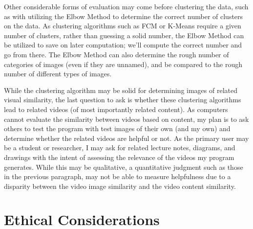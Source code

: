 \documentclass[10pt,twocolumn]{article}
\begin{document}
Other considerable forms of evaluation may come before clustering the data, such as with utilizing the Elbow Method to determine the correct number of clusters on the data. As clustering algorithms such as FCM or K-Means require a given number of clusters, rather than guessing a solid number, the Elbow Method can be utilized to save on later computation; we'll compute the correct number and go from there. The Elbow Method can also determine the rough number of categories of images (even if they are unnamed), and be compared to the rough number of different types of images.

While the clustering algorithm may be solid for determining images of related visual similarity, the last question to ask is whether these clustering algorithms lead to related videos (of most importantly related content). As computers cannot evaluate the similarity between videos based on content, my plan is to ask others to test the program with test images of their own (and my own) and determine whether the related videos are helpful or not. As the primary user may be a student or researcher, I may ask for related lecture notes, diagrams, and drawings with the intent of assessing the relevance of the videos my program generates. While this may be qualitative, a quantitative judgment such as those in the previous paragraph, may not be able to measure helpfulness due to a disparity between the video image similarity and the video content similarity.


\section {Ethical Considerations}

\end{document}

